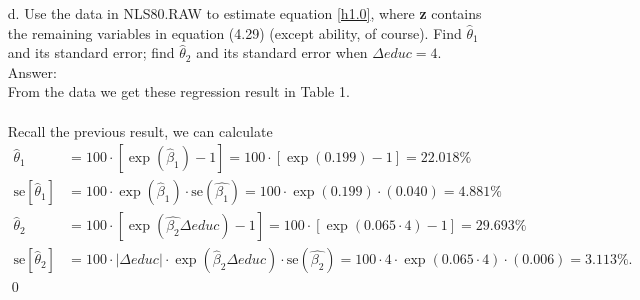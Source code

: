 \documentclass[10pt]{article}
\newcommand{\se}{\text{se}}
\begin{document}
\begin{enumerate}
\item[d.] Use the data in NLS80.RAW to estimate equation \eqref{h1.0}, where \textbf{z} contains the remaining variables in equation (4.29) (except ability, of course). Find $\hat{\theta}_1$ and its standard error; find $\hat{\theta}_2$ and its standard error when $\Delta educ=4.$ 
\\ Answer:\\
From the data we get these regression result in Table 1.\\
\\
Recall the previous result, we can calculate
\begin{align*}
    \hat{\theta}_1&=100\cdot[\exp{(\hat{\beta}_1)}-1]=100\cdot[\exp{(0.199)}-1]=22.018\%\\
    \se[\hat{\theta}_1]&=100\cdot\exp(\hat{\beta}_1)\cdot \se(\hat{\beta_1})=100\cdot\exp(0.199)\cdot(0.040)=4.881\%\\
    \hat{\theta}_2&=100\cdot[\exp{(\hat{\beta_2}\Delta educ)}-1]=100\cdot[\exp{(0.065\cdot 4)}-1]= 29.693\%\\
    \se[\hat{\theta}_2]&=100\cdot |\Delta educ| \cdot\exp(\hat{\beta}_2 \Delta educ)\cdot \se(\hat{\beta_2})=100\cdot 4 \cdot\exp(0.065 \cdot 4)\cdot (0.006)=3.113\%.
\end{align*}\qed
\end{enumerate}
\end{document}
